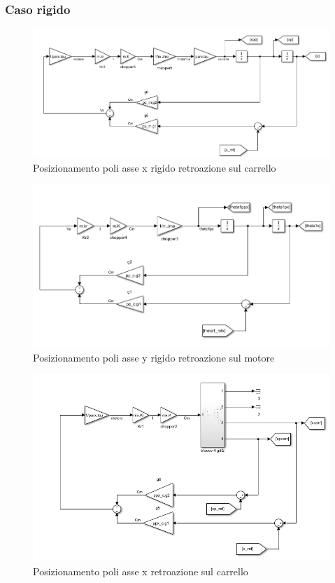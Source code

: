\documentclass{article}
\begin{document}
\subsubsection{Caso rigido}
\begin{figure}[H]
\centering
\includegraphics[width=.8\textwidth]{./simulink/ldm_rigido/pprigcarr.png}
\caption{ Posizionamento poli asse x rigido retroazione sul carrello}
\end{figure}
\begin{figure}[H]
\centering
\includegraphics[width=.8\textwidth]{./simulink/ldm_rigido/pprigmot.png}
\caption{ Posizionamento poli asse y rigido retroazione sul motore}
\end{figure}


\begin{figure}[H]
\centering
\includegraphics[width=.8\textwidth]{./simulink/pospoli/x/Cpospoli.png}
\caption{ Posizionamento poli asse x retroazione sul carrello}
\end{figure}
\end{document}
